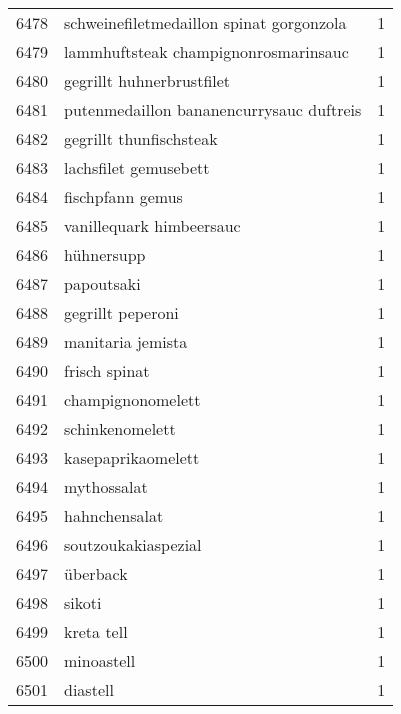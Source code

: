 \begin{tabular}{llr}
6478 &           schweinefiletmedaillon spinat gorgonzola &      1 \\
6479 &               lammhuftsteak champignonrosmarinsauc &      1 \\
6480 &                          gegrillt huhnerbrustfilet &      1 \\
6481 &           putenmedaillon bananencurrysauc duftreis &      1 \\
6482 &                            gegrillt thunfischsteak &      1 \\
6483 &                              lachsfilet gemusebett &      1 \\
6484 &                                   fischpfann gemus &      1 \\
6485 &                           vanillequark himbeersauc &      1 \\
6486 &                                        hühnersupp &      1 \\
6487 &                                         papoutsaki &      1 \\
6488 &                                  gegrillt peperoni &      1 \\
6489 &                                  manitaria jemista &      1 \\
6490 &                                      frisch spinat &      1 \\
6491 &                                  champignonomelett &      1 \\
6492 &                                    schinkenomelett &      1 \\
6493 &                                 kasepaprikaomelett &      1 \\
6494 &                                        mythossalat &      1 \\
6495 &                                      hahnchensalat &      1 \\
6496 &                                soutzoukakiaspezial &      1 \\
6497 &                                          überback &      1 \\
6498 &                                             sikoti &      1 \\
6499 &                                         kreta tell &      1 \\
6500 &                                         minoastell &      1 \\
6501 &                                           diastell &      1 \\

\end{tabular}
